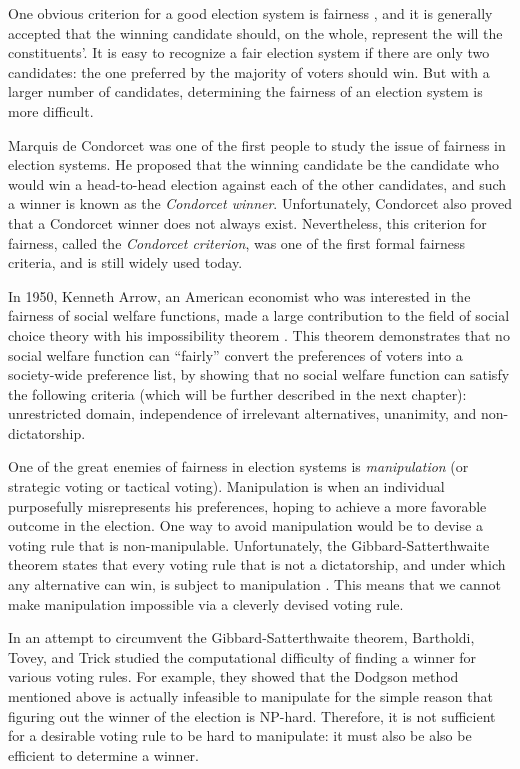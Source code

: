 	One obvious criterion for a good election system is fairness \cite{chevaleyre2006issues}, and it is generally accepted that the winning candidate should, on the whole, represent the will the constituents'. It is easy to recognize a fair election system if there are only two candidates: the one preferred by the majority of voters should win. But with a larger number of candidates, determining the fairness of an election system is more difficult.

	Marquis de Condorcet was one of the first people to study the issue of fairness in election systems. He proposed that the winning candidate be the candidate who would win a head-to-head election against each of the other candidates, and such a winner is known as the \emph{Condorcet winner}. Unfortunately, Condorcet also proved that a Condorcet winner does not always exist. Nevertheless, this criterion for fairness, called the \emph{Condorcet criterion}, was one of the first formal fairness criteria, and is still widely used today.

	In 1950, Kenneth Arrow, an American economist who was interested in the fairness of social welfare functions, made a large contribution to the field of social choice theory with his impossibility theorem \cite{arrow1950difficulty, arrow1963social}. This theorem demonstrates that no social welfare function can ``fairly'' convert the preferences of voters into a society-wide preference list, by showing that no social welfare function can satisfy the following criteria (which will be further described in the next chapter): unrestricted domain, independence of irrelevant alternatives, unanimity, and non-dictatorship.

	One of the great enemies of fairness in election systems is \emph{manipulation} (or strategic voting or tactical voting). Manipulation is when an individual purposefully misrepresents his preferences, hoping to achieve a more favorable outcome in the election. One way to avoid manipulation would be to devise a voting rule that is non-manipulable. Unfortunately, the Gibbard-Satterthwaite theorem states that every voting rule that is not a dictatorship, and under which any alternative can win, is subject to manipulation \cite{gibbard1973manipulation, satterthwaite1975strategy, duggan2000strategic}. This means that we cannot make manipulation impossible via a cleverly devised voting rule.

	In an attempt to circumvent the Gibbard-Satterthwaite theorem, Bartholdi, Tovey, and Trick studied the computational difficulty of finding a winner for various voting rules. For example, they showed that the Dodgson method mentioned above \cite{dodgson1876method} is actually infeasible to manipulate for the simple reason that figuring out the winner of the election is NP-hard. Therefore, it is not sufficient for a desirable voting rule to be hard to manipulate: it must also be also be efficient to determine a winner.

